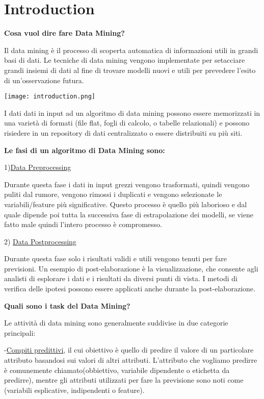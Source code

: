 \chapter{Introduction}
\textbf{Cosa vuol dire fare Data Mining?}

Il data mining è il processo di scoperta automatica di informazioni utili in grandi basi di dati. Le tecniche di data mining vengono implementate per setacciare grandi insiemi di dati al fine di trovare modelli nuovi e utili per prevedere l'esito di un'osservazione futura.

\texttt{[image: introduction.png]}

I dati dati in input ad un algoritmo di data mining possono essere memorizzati in una varietà di formati (file flat, fogli di calcolo,
o tabelle relazionali) e possono risiedere in un repository di dati centralizzato o essere
distribuiti su più siti. 

\textbf{ Le fasi di un algoritmo di Data Mining sono:}

1)\underline{Data Preprocessing}

Durante questa fase i dati in input grezzi vengono trasformati, quindi vengono puliti dal rumore, vengono rimossi i duplicati
e vengono selezionate le variabili/feature più significative. Questo processo è quello più laborioso e dal quale dipende
poi tutta la successiva fase di estrapolazione dei modelli, se viene fatto male quindi l'intero processo è compromesso.

2) \underline{Data Postprocessing}

Durante questa fase solo i risultati validi e utili vengono tenuti per fare previsioni.
Un esempio di post-elaborazione è la visualizzazione, che consente agli analisti di esplorare i dati e i risultati da diversi punti di vista.
I metodi di verifica delle ipotesi possono essere applicati anche durante la post-elaborazione.

\textbf{Quali sono i task del Data Mining?}

Le attività di data mining sono generalmente suddivise in due categorie principali:

-\underline{Compiti predittivi}, il cui obiettivo è quello di predire il valore di un particolare
attributo basandosi sui valori di altri attributi. L'attributo che vogliamo predirre è comunemente chiamato(obbiettivo, variabile dipendente o etichetta da predirre),
mentre gli attributi utilizzati per fare la previsione sono noti come (variabili esplicative, indipendenti o feature).


